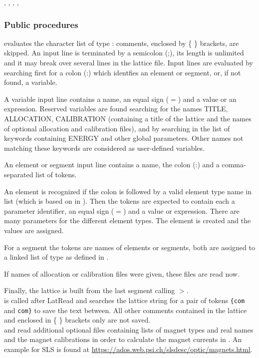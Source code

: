 \documentclass[12pt]{article}
\newcommand\code[1]{{\tt #1}}
\newcommand\guico[1]{{\color{blue}\code{#1}}}
\newcommand{\unico}[1]{{\color{burntorange}\code{#1}}}
\newcommand{\prcod}[2]{\opauni{#1}$>$\unico{#2}}
\newcommand{\opauni}[1]{\colorbox{orange!30}{{\color{black}\code{#1}}}}
\newcommand{\ouni}[1]{\hyperref[#1]{\opauni{#1}}}
\newcommand{\uses}[1]{\flushleft {\bf Uses:} #1}
\newcommand{\ppro}[1]{\subsubsection*{Public procedures} #1}
\begin{document}
\uses{\ouni{globlib}, \ouni{editorlib}, \ouni{varlib}, \ouni{mathlib}, \ouni{comauxlib}}

\ppro{
\unico{Latread} evaluates the character list of type \unico{TextBuffer}: comments, enclosed by \{ \} brackets, are skipped. An input line is terminated by a semicolon (;), its length is unlimited and it may break over several lines in the lattice file.  Input lines are evaluated by searching first for a colon (:) which identfies an element or segment, or, if not found, a variable.

A variable input line contains a name, an equal sign ($=$) and a value or an expression.
Reserved variables are found searching for the names TITLE, ALLOCATION, CALIBRATION (containing a title of the lattice and the names of optional allocation and calibration files), and by searching in the list of keywords \unico{globkeyw} containing ENERGY and other global parameters. Other names not matching these keywords are considered as user-defined variables.

An element or segment input line contains a name, the colon (:) and a comma-separated list of tokens.

An element is recognized if the colon is followed by a valid element type name in list \unico{elemkeyw} (which is based on \unico{ElemName} in \ouni{globlib}). Then the tokens are expected to contain each a parameter identifier, an equal sign ($=$) and a value or expression. There are many parameters for the different element types. The element is created and the values are assigned.

For a segment the tokens are names of elements or segments, both are  assigned to a linked list of type \unico{AbstractEleType} as defined in \ouni{globlib}.

If names of allocation or calibration files were given, these files are read now.

Finally, the lattice is built from the last segment calling \prcod{editlib}{MakeLattice}.\\


\unico{LatReadCom} is called after LatRead and searches the lattice string for a pair of tokens \code{\{com} and \code{com\}} to save the text between. All other comments contained in the lattice and enclosed in \{ \} brackets only are not saved.\\

\unico{ReadAllocation} and \unico{ReadCalibration} read additional optional files containing lists of magnet types and real names and the magnet calibrations in order to calculate the magnet currents in \guico{opacurrents}. 
An example for SLS is found at \url{https://ados.web.psi.ch/slsdesc/optic/magnets.html}. 

}
\end{document}

